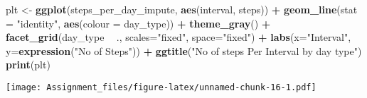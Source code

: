\documentclass[
]{article}
\newenvironment{Shaded}{\begin{snugshade}}{\end{snugshade}}
\newcommand{\DataTypeTok}[1]{\textcolor[rgb]{0.13,0.29,0.53}{#1}}
\newcommand{\KeywordTok}[1]{\textcolor[rgb]{0.13,0.29,0.53}{\textbf{#1}}}
\newcommand{\NormalTok}[1]{#1}
\newcommand{\OperatorTok}[1]{\textcolor[rgb]{0.81,0.36,0.00}{\textbf{#1}}}
\newcommand{\StringTok}[1]{\textcolor[rgb]{0.31,0.60,0.02}{#1}}
\begin{document}
\begin{Shaded}
\begin{Highlighting}[]
\NormalTok{plt <-}\StringTok{ }\KeywordTok{ggplot}\NormalTok{(steps_per_day_impute, }\KeywordTok{aes}\NormalTok{(interval, steps)) }\OperatorTok{+}
\StringTok{  }\KeywordTok{geom_line}\NormalTok{(}\DataTypeTok{stat =} \StringTok{"identity"}\NormalTok{, }\KeywordTok{aes}\NormalTok{(}\DataTypeTok{colour =}\NormalTok{ day_type)) }\OperatorTok{+}
\StringTok{  }\KeywordTok{theme_gray}\NormalTok{() }\OperatorTok{+}
\StringTok{  }\KeywordTok{facet_grid}\NormalTok{(day_type }\OperatorTok{~}\StringTok{ }\NormalTok{., }\DataTypeTok{scales=}\StringTok{"fixed"}\NormalTok{, }\DataTypeTok{space=}\StringTok{"fixed"}\NormalTok{) }\OperatorTok{+}
\StringTok{  }\KeywordTok{labs}\NormalTok{(}\DataTypeTok{x=}\StringTok{"Interval"}\NormalTok{, }\DataTypeTok{y=}\KeywordTok{expression}\NormalTok{(}\StringTok{"No of Steps"}\NormalTok{)) }\OperatorTok{+}
\StringTok{  }\KeywordTok{ggtitle}\NormalTok{(}\StringTok{"No of steps Per Interval by day type"}\NormalTok{)}
\KeywordTok{print}\NormalTok{(plt)}
\end{Highlighting}
\end{Shaded}

\texttt{[image: Assignment\_files/figure-latex/unnamed-chunk-16-1.pdf]}
\end{document}
